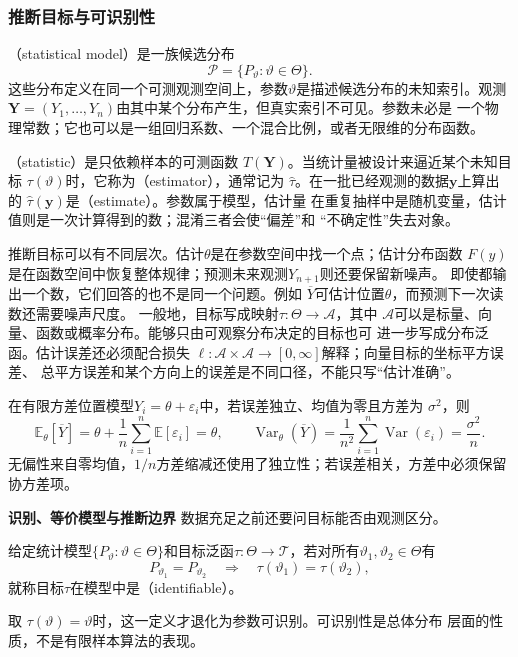 \subsubsection{推断目标与可识别性}
\label{sec:statistics-model-target}
\begin{definition}[统计模型与统计量]
  \label{def:statistics-model-statistic}
（statistical model）是一族候选分布
\[
  \mathcal{P}=\{P_\vartheta:\vartheta\in\Theta\}.
\]
这些分布定义在同一个可测观测空间上，参数\(\vartheta\)是描述候选分布的未知索引。观测
\(\bm{Y}=(Y_1,\ldots,Y_n)\)由其中某个分布产生，但真实索引不可见。参数未必是
一个物理常数；它也可以是一组回归系数、一个混合比例，或者无限维的分布函数。

（statistic）是只依赖样本的可测函数
\(T(\bm{Y})\)。当统计量被设计来逼近某个未知目标
\(\tau(\vartheta)\)时，它称为（estimator），通常记为
\(\widehat{\tau}\)。在一批已经观测的数据\(\bm{y}\)上算出的
\(\widehat{\tau}(\bm{y})\)是（estimate）。参数属于模型，估计量
在重复抽样中是随机变量，估计值则是一次计算得到的数；混淆三者会使“偏差”和
“不确定性”失去对象。
\end{definition}

推断目标可以有不同层次。估计\(\theta\)是在参数空间中找一个点；估计分布函数
\(F(y)\)是在函数空间中恢复整体规律；预测未来观测\(Y_{n+1}\)则还要保留新噪声。
即使都输出一个数，它们回答的也不是同一个问题。例如
\(\overline{Y}\)可估计位置\(\theta\)，而预测下一次读数还需要噪声尺度。
一般地，目标写成映射\(\tau:\Theta\to\mathcal A\)，其中
\(\mathcal A\)可以是标量、向量、函数或概率分布。能够只由可观察分布决定的目标也可
进一步写成分布泛函。估计误差还必须配合损失
\(\ell:\mathcal A\times\mathcal A\to[0,\infty]\)解释；向量目标的坐标平方误差、
总平方误差和某个方向上的误差是不同口径，不能只写“估计准确”。

在有限方差位置模型\(Y_i=\theta+\varepsilon_i\)中，若误差独立、均值为零且方差为
\(\sigma^2\)，则
\[
  \mathbb{E}_\theta[\overline Y]
  =\theta+\frac1n\sum_{i=1}^n\mathbb{E}[\varepsilon_i]
  =\theta,\qquad
  \operatorname{Var}_\theta(\overline Y)
  =\frac1{n^2}\sum_{i=1}^n\operatorname{Var}(\varepsilon_i)
  =\frac{\sigma^2}{n}.
\]
无偏性来自零均值，\(1/n\)方差缩减还使用了独立性；若误差相关，方差中必须保留
协方差项。

\par\medskip\noindent\textbf{识别、等价模型与推断边界}\quad
数据充足之前还要问目标能否由观测区分。
\begin{definition}[目标可识别性]
  \label{def:statistics-identifiability}
  给定统计模型\(\{P_\vartheta:\vartheta\in\Theta\}\)和目标泛函\(\tau:\Theta\to\mathcal T\)，若对所有\(\vartheta_1,\vartheta_2\in\Theta\)有
\[
  P_{\vartheta_1}=P_{\vartheta_2}
  \quad\Longrightarrow\quad
  \tau(\vartheta_1)=\tau(\vartheta_2),
\]
就称目标\(\tau\)在模型中是（identifiable）。
\end{definition}
取
\(\tau(\vartheta)=\vartheta\)时，这一定义才退化为参数可识别。可识别性是总体分布
层面的性质，不是有限样本算法的表现。

